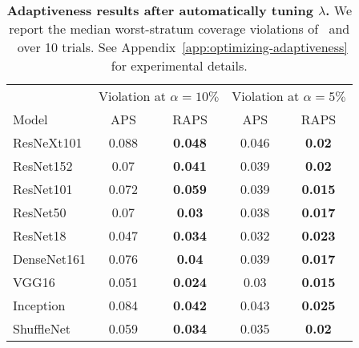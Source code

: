 \begin{table}[t]
\centering
\small
\begin{tabular}{lcccc}
\toprule 
 & \multicolumn{2}{c}{Violation at $\alpha=10\%$}  & \multicolumn{2}{c}{Violation at $\alpha=5\%$} \\ 
\cmidrule(r){2-3}  \cmidrule(r){4-5} 
Model & APS & RAPS & APS & RAPS \\ 
\midrule 
ResNeXt101 & 0.088 & \bf 0.048 & 0.046 & \bf 0.02 \\ 
ResNet152 & 0.07 & \bf 0.041 & 0.039 & \bf 0.02 \\ 
ResNet101 & 0.072 & \bf 0.059 & 0.039 & \bf 0.015 \\ 
ResNet50 & 0.07 & \bf 0.03 & 0.038 & \bf 0.017 \\ 
ResNet18 & 0.047 & \bf 0.034 & 0.032 & \bf 0.023 \\ 
DenseNet161 & 0.076 & \bf 0.04 & 0.039 & \bf 0.017 \\ 
VGG16 & 0.051 & \bf 0.024 & 0.03 & \bf 0.015 \\ 
Inception & 0.084 & \bf 0.042 & 0.043 & \bf 0.025 \\ 
ShuffleNet & 0.059 & \bf 0.034 & 0.035 & \bf 0.02 \\ 
\bottomrule 
\end{tabular} 
\caption{\textbf{Adaptiveness results after automatically tuning $\lambda$.} We report the median worst-stratum coverage violations of \aps\ and \raps\ over 10 trials. See Appendix~\ref{app:optimizing-adaptiveness} for experimental details.} 
\label{table:tunelambda} 
\end{table} 
